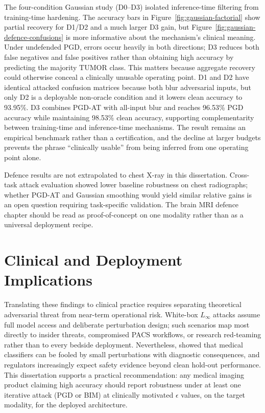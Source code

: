 \documentclass[12pt,a4paper,oneside]{report}
\begin{document}
The four-condition Gaussian study (D0--D3) isolated inference-time filtering from training-time hardening. The accuracy bars in Figure~\ref{fig:gaussian-factorial} show partial recovery for D1/D2 and a much larger D3 gain, but Figure~\ref{fig:gaussian-defence-confusions} is more informative about the mechanism's clinical meaning. Under undefended PGD, errors occur heavily in both directions; D3 reduces both false negatives and false positives rather than obtaining high accuracy by predicting the majority TUMOR class. This matters because aggregate recovery could otherwise conceal a clinically unusable operating point. D1 and D2 have identical attacked confusion matrices because both blur adversarial inputs, but only D2 is a deployable non-oracle condition and it lowers clean accuracy to 93.95\%. D3 combines PGD-AT with all-input blur and reaches 96.53\% PGD accuracy while maintaining 98.53\% clean accuracy, supporting complementarity between training-time and inference-time mechanisms. The result remains an empirical benchmark rather than a certification, and the decline at larger budgets prevents the phrase ``clinically usable'' from being inferred from one operating point alone.

Defence results are not extrapolated to chest X-ray in this dissertation. Cross-task attack evaluation showed lower baseline robustness on chest radiographs; whether PGD-AT and Gaussian smoothing would yield similar relative gains is an open question requiring task-specific validation. The brain MRI defence chapter should be read as proof-of-concept on one modality rather than as a universal deployment recipe.

\section{Clinical and Deployment Implications}
\label{sec:disc-clinical}


Translating these findings to clinical practice requires separating theoretical adversarial threat from near-term operational risk. White-box $L_\infty$ attacks assume full model access and deliberate perturbation design; such scenarios map most directly to insider threats, compromised PACS workflows, or research red-teaming rather than to every bedside deployment. Nevertheless, \citet{finlayson2019adversarial} showed that medical classifiers can be fooled by small perturbations with diagnostic consequences, and regulators increasingly expect safety evidence beyond clean hold-out performance. This dissertation supports a practical recommendation: any medical imaging product claiming high accuracy should report robustness under at least one iterative attack (PGD or BIM) at clinically motivated $\epsilon$ values, on the target modality, for the deployed architecture.
\end{document}
